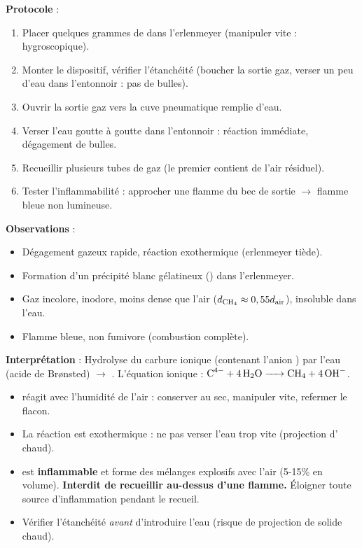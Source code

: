 \documentclass[11pt]{article}
\begin{document}
\begin{experience}
\textbf{Protocole} :
\begin{enumerate}
  \item Placer quelques grammes de  dans l'erlenmeyer (manipuler vite : hygroscopique).
  \item Monter le dispositif, vérifier l'étanchéité (boucher la sortie gaz, verser un peu d'eau dans l'entonnoir : pas de bulles).
  \item Ouvrir la sortie gaz vers la cuve pneumatique remplie d'eau.
  \item Verser l'eau goutte à goutte dans l'entonnoir : réaction immédiate, dégagement de bulles.
  \item Recueillir plusieurs tubes de gaz (le premier contient de l'air résiduel).
  \item Tester l'inflammabilité : approcher une flamme du bec de sortie $\to$ flamme bleue non lumineuse.
\end{enumerate}

\textbf{Observations} :
\begin{itemize}
  \item Dégagement gazeux rapide, réaction exothermique (erlenmeyer tiède).
  \item Formation d'un précipité blanc gélatineux () dans l'erlenmeyer.
  \item Gaz incolore, inodore, moins dense que l'air ($d_{\ce{CH4}} \approx 0,55 d_{\text{air}}$), insoluble dans l'eau.
  \item Flamme bleue, non fumivore (combustion complète).
\end{itemize}

\textbf{Interprétation} : Hydrolyse du carbure ionique  (contenant l'anion ) par l'eau (acide de Brønsted) $\to$ . L'équation ionique : $\ce{C^4- + 4 H2O -> CH4 + 4 OH-}$.
\end{experience}

\begin{attention}
\begin{itemize}
  \item {} réagit avec l'humidité de l'air : conserver au sec, manipuler vite, refermer le flacon.
  \item La réaction est exothermique : ne pas verser l'eau trop vite (projection d' chaud).
  \item {} est \textbf{inflammable} et forme des mélanges explosifs avec l'air (5-15\% en volume). \textbf{Interdit de recueillir au-dessus d'une flamme.} Éloigner toute source d'inflammation pendant le recueil.
  \item Vérifier l'étanchéité \emph{avant} d'introduire l'eau (risque de projection de solide chaud).
\end{itemize}
\end{attention}
\end{document}
